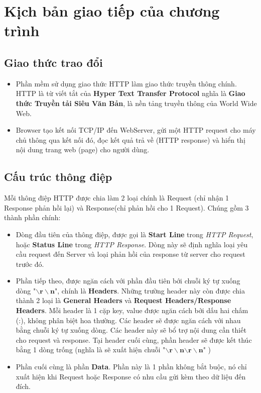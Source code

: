 \documentclass[14pt, a4paper]{extarticle}
\begin{document}
\section{Kịch bản giao tiếp của chương trình}
\subsection{Giao thức trao đổi}
\begin{itemize}
    \item Phần mềm sử dụng giao thức HTTP làm giao thức truyền thông chính. HTTP là từ viết tắt của \textbf{Hyper Text Transfer Protocol} nghĩa là \textbf{Giao thức Truyền tải Siêu Văn Bản}, là nền tảng truyền thông của World Wide Web.
    \item Browser tạo kết nối TCP/IP đến WebServer, gửi một HTTP request cho máy chủ thông qua kết nối đó, đọc kết quả trả về (HTTP response) và hiển thị nội dung trang web (page) cho người dùng.
\end{itemize}
\subsection{Cấu trúc thông điệp}

Mỗi thông điệp HTTP được chia làm 2 loại chính là Request (chỉ nhận 1 Response phản hồi lại) và Response(chỉ phản hồi cho 1 Request). Chúng gồm 3 thành phần chính:
\begin{itemize}
    \item Dòng đầu tiên của thông điệp, được gọi là \textbf{Start Line} trong \textit{HTTP Request}, hoặc \textbf{Status Line} trong \textit{HTTP Response}. Dòng này sẽ định nghĩa loại yêu cầu request đến Server và loại phản hồi của response từ server cho request trước đó.
    \item Phần tiếp theo, được ngăn cách với phần đầu tiên bới chuỗi ký tự xuống dòng "$\bm{\backslash r \backslash n}$", chính là \textbf{Headers}. Những trường header này còn được chia thành 2 loại là \textbf{General Headers} và \textbf{Request Headers/Response Headers}. Mỗi header là 1 cặp key, value được ngăn cách bởi dấu hai chấm (:), không phân biệt hoa thường. Các header sẽ được ngăn cách với nhau bằng chuỗi ký tự xuống dòng. Các header này sẽ bổ trợ nội dung cần thiết cho request và response. Tại header cuối cùng, phần header sẽ được kết thúc bằng 1 dòng trống (nghĩa là sẽ xuất hiện chuỗi "$\bm{\backslash r \backslash n}\bm{\backslash r \backslash n}$"
    )
    \item Phần cuối cùng là phần \textbf{Data}. Phần này là 1 phần không bắt buộc, nó chỉ xuất hiện khi Request hoặc Response có nhu cầu gửi kèm theo dữ liệu đến đích.
\end{itemize}
\end{document}
